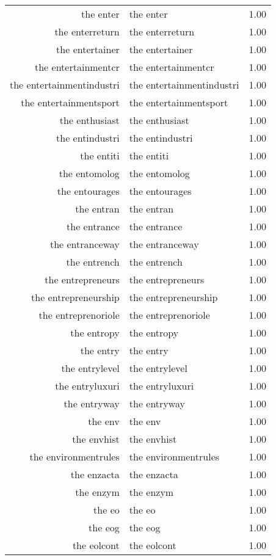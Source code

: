 \begin{table}[ht]
\begin{tabular}{rlr}
  the enter & the enter & 1.00 \\ 
  the enterreturn & the enterreturn & 1.00 \\ 
  the entertainer & the entertainer & 1.00 \\ 
  the entertainmentcr & the entertainmentcr & 1.00 \\ 
  the entertainmentindustri & the entertainmentindustri & 1.00 \\ 
  the entertainmentsport & the entertainmentsport & 1.00 \\ 
  the enthusiast & the enthusiast & 1.00 \\ 
  the entindustri & the entindustri & 1.00 \\ 
  the entiti & the entiti & 1.00 \\ 
  the entomolog & the entomolog & 1.00 \\ 
  the entourages & the entourages & 1.00 \\ 
  the entran & the entran & 1.00 \\ 
  the entrance & the entrance & 1.00 \\ 
  the entranceway & the entranceway & 1.00 \\ 
  the entrench & the entrench & 1.00 \\ 
  the entrepreneurs & the entrepreneurs & 1.00 \\ 
  the entrepreneurship & the entrepreneurship & 1.00 \\ 
  the entreprenoriole & the entreprenoriole & 1.00 \\ 
  the entropy & the entropy & 1.00 \\ 
  the entry & the entry & 1.00 \\ 
  the entrylevel & the entrylevel & 1.00 \\ 
  the entryluxuri & the entryluxuri & 1.00 \\ 
  the entryway & the entryway & 1.00 \\ 
  the env & the env & 1.00 \\ 
  the envhist & the envhist & 1.00 \\ 
  the environmentrules & the environmentrules & 1.00 \\ 
  the enzacta & the enzacta & 1.00 \\ 
  the enzym & the enzym & 1.00 \\ 
  the eo & the eo & 1.00 \\ 
  the eog & the eog & 1.00 \\ 
  the eolcont & the eolcont & 1.00 \\ 

\end{tabular}
\end{table}
